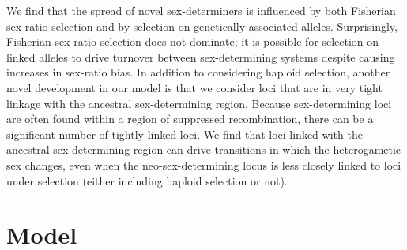 \documentclass[12pt]{article}
\begin{document}
We find that the spread of novel sex-determiners is influenced by both Fisherian sex-ratio selection and by selection on genetically-associated alleles. 
Surprisingly, Fisherian sex ratio selection does not dominate; it is possible for selection on linked alleles to drive turnover between sex-determining systems despite causing increases in sex-ratio bias. 
In addition to considering haploid selection, another novel development in our model is that we consider loci that are in very tight linkage with the ancestral sex-determining region. 
Because sex-determining loci are often found within a region of suppressed recombination, there can be a significant number of tightly linked loci. 
We find that loci linked with the ancestral sex-determining region can drive transitions in which the heterogametic sex changes, even when the neo-sex-determining locus is less closely linked to loci under selection (either including haploid selection or not). 

\section*{Model}
\end{document}
